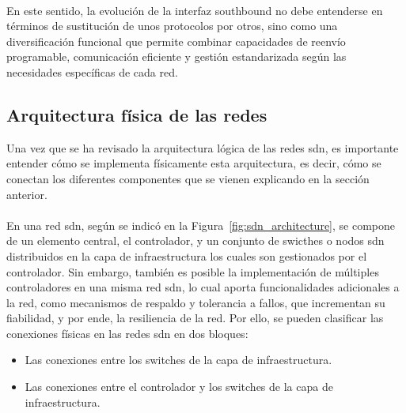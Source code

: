 \\
En este sentido, la evolución de la interfaz southbound no debe entenderse en términos de sustitución de unos protocolos por otros, sino como una diversificación funcional que permite combinar capacidades de reenvío programable, comunicación eficiente y gestión estandarizada según las necesidades específicas de cada red.


\subsection{Arquitectura física de las redes }
\label{subsec:arquitectura_fisica_sdn}

Una vez que se ha revisado la arquitectura lógica de las redes \gls{sdn}, es importante entender cómo se implementa físicamente esta arquitectura, es decir, cómo se conectan los diferentes componentes que se vienen explicando en la sección anterior.\\
\\
En una red \gls{sdn}, según se indicó en la Figura~\ref{fig:sdn_architecture}, se compone de un elemento central, el controlador, y un conjunto de swicthes o nodos \gls{sdn} distribuidos en la capa de infraestructura los cuales son gestionados por el controlador. Sin embargo, también es posible la implementación de múltiples controladores en una misma red \gls{sdn}, lo cual aporta funcionalidades adicionales a la red, como mecanismos de respaldo y tolerancia a fallos, que incrementan su fiabilidad, y por ende, la resiliencia de la red. Por ello, se pueden clasificar las conexiones físicas en las redes \gls{sdn} en dos bloques:  

\begin{itemize}
    \item Las conexiones entre los switches de la capa de infraestructura.
    \item Las conexiones entre el controlador y los switches de la capa de infraestructura.
\end{itemize}
 
